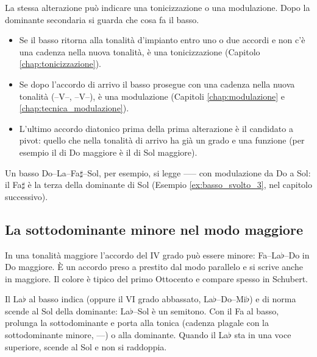 La stessa alterazione può indicare una tonicizzazione o una modulazione. Dopo la dominante secondaria si guarda che cosa fa il basso.

\begin{regola}
	\label{reg:ton_mod_basso}
	\begin{itemize}
		\item Se il basso ritorna alla tonalità d'impianto entro uno o due accordi e non c'è una cadenza nella nuova tonalità, è una tonicizzazione (Capitolo \ref{chap:tonicizzazione}).
		\item Se dopo l'accordo di arrivo il basso prosegue con una cadenza nella nuova tonalità (--V--, --V--), è una modulazione (Capitoli \ref{chap:modulazione} e \ref{chap:tecnica_modulazione}).
		\item L'ultimo accordo diatonico prima della prima alterazione è il candidato a pivot: quello che nella tonalità di arrivo ha già un grado e una funzione (per esempio il  di Do maggiore è il  di Sol maggiore).
	\end{itemize}
\end{regola}

Un basso Do--La--Fa$\sharp$--Sol, per esempio, si legge ------ con modulazione da Do a Sol: il Fa$\sharp$ è la terza della dominante di Sol (Esempio \ref{ex:basso_svolto_3}, nel capitolo successivo).

\subsection*{La sottodominante minore nel modo maggiore}
\label{sec:iv_maggiore}

In una tonalità maggiore l'accordo del IV grado può essere minore: Fa--La$\flat$--Do in Do maggiore. È un accordo preso a prestito dal modo parallelo e si scrive  anche in maggiore. Il colore è tipico del primo Ottocento e compare spesso in Schubert.

Il La$\flat$ al basso indica  (oppure il VI grado abbassato, La$\flat$--Do--Mi$\flat$) e di norma scende al Sol della dominante: La$\flat$--Sol è un semitono. Con il Fa al basso,  prolunga la sottodominante e porta alla tonica (cadenza plagale con la sottodominante minore, ----) o alla dominante. Quando il La$\flat$ sta in una voce superiore, scende al Sol e non si raddoppia.

